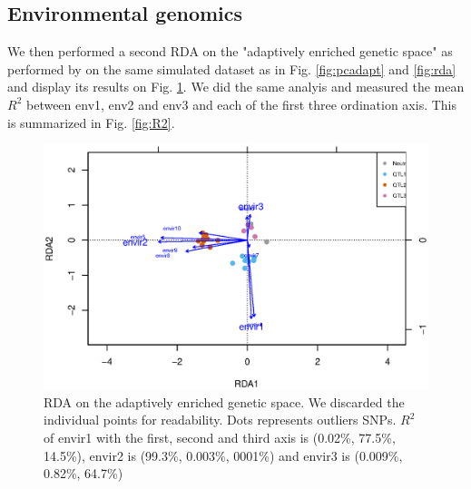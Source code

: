 \documentclass[nogrid]{MBE}%
\begin{document}
\subsection{Environmental genomics}

We then performed a second RDA on the "adaptively enriched genetic space" as performed by \citet{Steane2014a} on the same simulated dataset as in Fig. \ref{fig:pcadapt} and \ref{fig:rda} and display its results on Fig. \ref{fig:rdaA}. We did the same analyis and measured the mean $R^2$ between env1, env2 and env3 and each of the first three ordination axis. This is summarized in Fig. \ref{fig:R2}.

\begin{figure}[t]
\begin{center}
\includegraphics[height=0.4\textheight]{figures/rdaA.eps}
\end{center}
\caption{RDA on the adaptively enriched genetic space. We discarded the individual points for readability. Dots represents outliers SNPs.  $R^2$ of envir1 with the first, second and third axis is (0.02\%, 77.5\%, 14.5\%), envir2 is (99.3\%, 0.003\%, 0001\%) and envir3 is (0.009\%, 0.82\%, 64.7\%)}%
\label{fig:rdaA}%
\end{figure}
\end{document}
